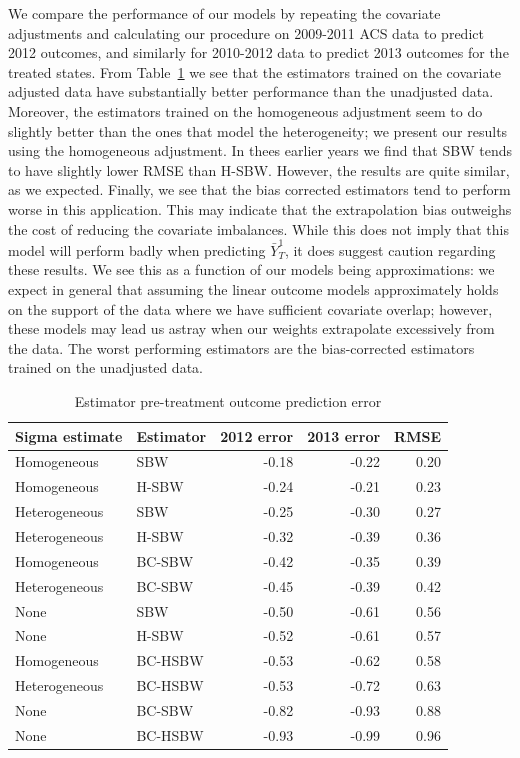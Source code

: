 \documentclass[aoas]{imsart}
\theoremstyle{plain}
\theoremstyle{remark}
\begin{document}
We compare the performance of our models by repeating the covariate adjustments and calculating our procedure on 2009-2011 ACS data to predict 2012 outcomes, and similarly for 2010-2012 data to predict 2013 outcomes for the treated states. From Table~\ref{tab:pretxpred} we see that the estimators trained on the covariate adjusted data have substantially better performance than the unadjusted data. Moreover, the estimators trained on the homogeneous adjustment seem to do slightly better than the ones that model the heterogeneity; we present our results using the homogeneous adjustment. In thees earlier years we find that SBW tends to have slightly lower RMSE than H-SBW. However, the results are quite similar, as we expected. Finally, we see that the bias corrected estimators tend to perform worse in this application. This may indicate that the extrapolation bias outweighs the cost of reducing the covariate imbalances. While this does not imply that this model will perform badly when predicting $\bar{Y}^1_T$, it does suggest caution regarding these results. We see this as a function of our models being approximations: we expect in general that assuming the linear outcome models approximately holds on the support of the data where we have sufficient covariate overlap; however, these models may lead us astray when our weights extrapolate excessively from the data. The worst performing estimators are the bias-corrected estimators trained on the unadjusted data.

\begin{table}[ht]
\caption{Estimator pre-treatment outcome prediction error}
\label{tab:pretxpred}
\begin{tabular}{llrrr}
  \hline
Sigma estimate & Estimator & 2012 error & 2013 error & RMSE \\ 
  \hline
Homogeneous & SBW & -0.18 & -0.22 & 0.20 \\ 
  Homogeneous & H-SBW & -0.24 & -0.21 & 0.23 \\ 
  Heterogeneous & SBW & -0.25 & -0.30 & 0.27 \\ 
  Heterogeneous & H-SBW & -0.32 & -0.39 & 0.36 \\ 
  Homogeneous & BC-SBW & -0.42 & -0.35 & 0.39 \\ 
  Heterogeneous & BC-SBW & -0.45 & -0.39 & 0.42 \\ 
  None & SBW & -0.50 & -0.61 & 0.56 \\ 
  None & H-SBW & -0.52 & -0.61 & 0.57 \\ 
  Homogeneous & BC-HSBW & -0.53 & -0.62 & 0.58 \\ 
  Heterogeneous & BC-HSBW & -0.53 & -0.72 & 0.63 \\ 
  None & BC-SBW & -0.82 & -0.93 & 0.88 \\ 
  None & BC-HSBW & -0.93 & -0.99 & 0.96 \\ 
   \hline
\end{tabular}
\end{table}
\end{document}
